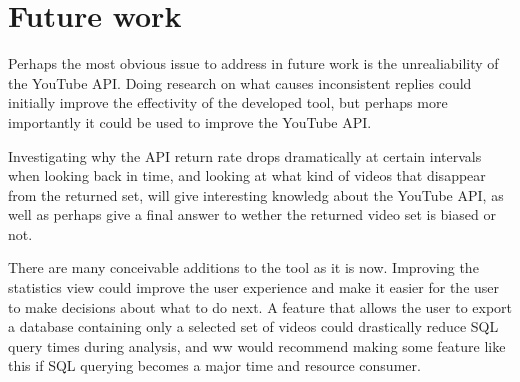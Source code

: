 \section{Future work}
Perhaps the most obvious issue to address in future work is the unrealiability
of the YouTube API. Doing research on what causes inconsistent replies could
initially improve the effectivity of the developed tool, but perhaps more 
importantly it could be used to improve the YouTube API. 

Investigating why the API return rate drops dramatically at certain intervals
when looking back in time, and looking at what kind of videos that disappear
from the returned set, will give interesting knowledg about the YouTube API,
as well as perhaps give a final answer to wether the returned video set is
biased or not.

There are many conceivable additions to the tool as it is now. Improving the
statistics view could improve the user experience and make it easier for the
user to make decisions about what to do next. A feature that allows the user to
export a database containing only a selected set of videos could drastically
reduce SQL query times during analysis, and ww would recommend making some
feature like this if SQL querying becomes a major time and resource consumer.

